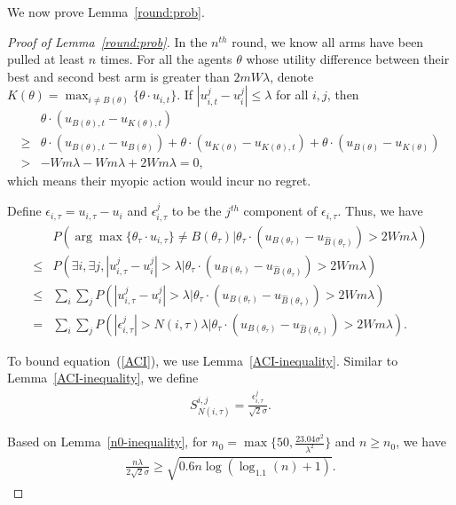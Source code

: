 \documentclass{article}
\begin{document}
We now prove Lemma~\ref{round:prob}.

\begin{proof}[Proof of Lemma~\ref{round:prob}]
In the $n^{th}$ round, we know all arms have been pulled at least $n$ times. For all the agents $\theta$ whose utility difference between their best and second best arm is greater than $2mW\lambda$, denote $K(\theta)=\max_{i\neq B(\theta)}\{\theta\cdot u_{i,t}\}$. If $|u_{i,t}^{j}-u_{i}^{j}|\leq \lambda$ for all $i,j$, then
\begin{align}
&\theta\cdot(u_{B(\theta),t}-u_{K(\theta),t}) \nonumber \\
\geq & \theta\cdot(u_{B(\theta),t}-u_{B(\theta)}) + \theta\cdot(u_{K(\theta)}-u_{K(\theta),t}) + \theta\cdot(u_{B(\theta)}-u_{K(\theta)}) \nonumber \\
> & -Wm\lambda - Wm\lambda + 2Wm\lambda = 0,\nonumber
\end{align}
which means their myopic action would incur no regret.


Define $\epsilon_{i,\tau}=u_{i,\tau}-u_i$ and $\epsilon_{i,\tau}^{j}$ to be the $j^{th}$ component of $\epsilon_{i,\tau}$. Thus, we have
\begin{align}
&P(\arg\max\{\theta_{\tau}\cdot u_{i,\tau}\}\neq B(\theta_{\tau})|\theta_{\tau}\cdot(u_{B(\theta_{\tau})}-u_{\hat{B}(\theta_{\tau})})> 2Wm\lambda)\nonumber \\
\leq &P(\exists i, \exists j, |u_{i,\tau}^{j}-u_{i}^{j}|>\lambda |\theta_{\tau}\cdot(u_{B(\theta_{\tau})}-u_{\hat{B}(\theta_{\tau})})> 2Wm\lambda) \nonumber \\
\leq & \sum_{i}\sum_{j} P(|u_{i,\tau}^{j}-u_{i}^{j}|>\lambda|\theta_{\tau}\cdot(u_{B(\theta_{\tau})}-u_{\hat{B}(\theta_{\tau})})> 2Wm\lambda) \nonumber \\
= &  \sum_{i}\sum_{j} P(|\epsilon_{i,\tau}^{j}|>N(i,\tau)\lambda|\theta_{\tau}\cdot(u_{B(\theta_{\tau})}-u_{\hat{B}(\theta_{\tau})})> 2Wm\lambda). \label{ACI}
\end{align}

To bound equation~(\ref{ACI}), we use Lemma~\ref{ACI-inequality}. Similar to Lemma~\ref{ACI-inequality}, we define
\begin{align}
S_{N(i,\tau)}^{i,j}=\frac{\epsilon_{i,\tau}^{j}}{\sqrt{2}\sigma}. \nonumber
\end{align}

Based on Lemma~\ref{n0-inequality}, for $n_{0}=\max\{50, \frac{23.04\sigma^2}{\lambda^2}\}$ and $n\geq n_{0}$, we have
\begin{align}
\frac{n\lambda}{2\sqrt{2}\sigma}\geq \sqrt{0.6n\log(\log_{1.1}(n)+1)}. \nonumber
\end{align}


\end{proof}
\end{document}
